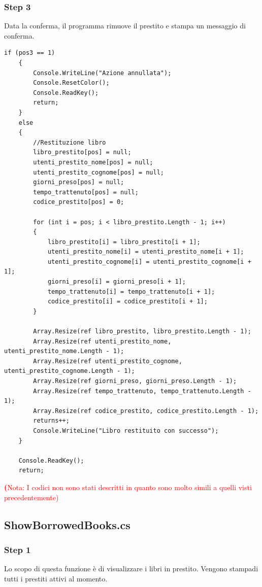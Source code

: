 \documentclass[a4paper,12pt]{article}
\begin{document}
\newpage

\subsubsection{Step 3}
Data la conferma, il programma rimuove il prestito e stampa un messaggio di conferma.

\begin{lstlisting}
if (pos3 == 1)
    {
        Console.WriteLine("Azione annullata");
        Console.ResetColor();
        Console.ReadKey();
        return;
    }
    else
    {
        //Restituzione libro
        libro_prestito[pos] = null;
        utenti_prestito_nome[pos] = null;
        utenti_prestito_cognome[pos] = null;
        giorni_preso[pos] = null;
        tempo_trattenuto[pos] = null;
        codice_prestito[pos] = 0;

        for (int i = pos; i < libro_prestito.Length - 1; i++)
        {
            libro_prestito[i] = libro_prestito[i + 1];
            utenti_prestito_nome[i] = utenti_prestito_nome[i + 1];
            utenti_prestito_cognome[i] = utenti_prestito_cognome[i + 1];
            giorni_preso[i] = giorni_preso[i + 1];
            tempo_trattenuto[i] = tempo_trattenuto[i + 1];
            codice_prestito[i] = codice_prestito[i + 1];
        }

        Array.Resize(ref libro_prestito, libro_prestito.Length - 1);
        Array.Resize(ref utenti_prestito_nome, utenti_prestito_nome.Length - 1);
        Array.Resize(ref utenti_prestito_cognome, utenti_prestito_cognome.Length - 1);
        Array.Resize(ref giorni_preso, giorni_preso.Length - 1);
        Array.Resize(ref tempo_trattenuto, tempo_trattenuto.Length - 1);
        Array.Resize(ref codice_prestito, codice_prestito.Length - 1);
        returns++;
        Console.WriteLine("Libro restituito con successo");
    }

    Console.ReadKey();
    return;
\end{lstlisting}

\textcolor{red}{\textbf(Nota: I codici non sono stati descritti in quanto sono molto simili a quelli visti precedentemente)}

\newpage

\subsection{ShowBorrowedBooks.cs}
\subsubsection{Step 1}
Lo scopo di questa funzione è di visualizzare i libri in prestito.
Vengono stampadi tutti i prestiti attivi al momento.
\end{document}
